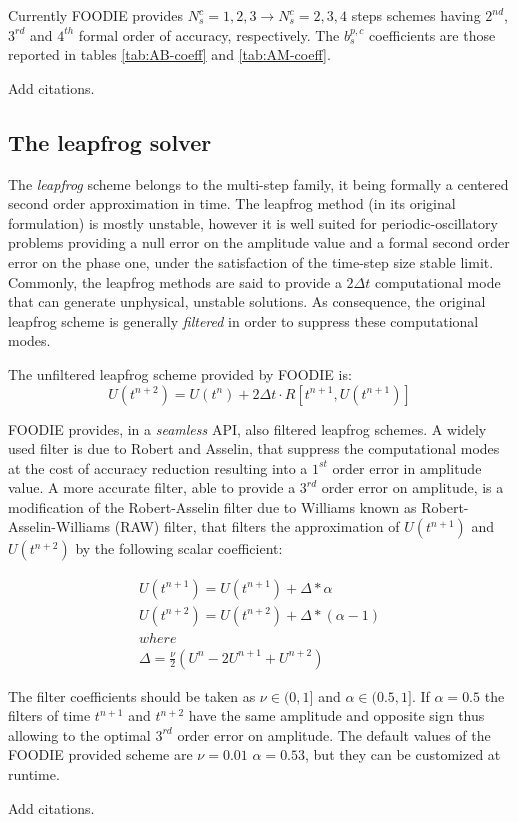Currently FOODIE provides $N_s^c=1, 2, 3 \rightarrow N_s^c=2, 3, 4$ steps schemes having $2^{nd}$, $3^{rd}$ and $4^{th}$ formal order of accuracy, respectively. The $b_s^{p,c}$ coefficients are those reported in tables \ref{tab:AB-coeff} and \ref{tab:AM-coeff}.

{\color{red} Add citations.}

\subsection{The leapfrog solver}

The \emph{leapfrog} scheme belongs to the multi-step family, it being formally a centered second order approximation in time. The leapfrog method (in its original formulation) is mostly unstable, however it is well suited for periodic-oscillatory problems providing a null error on the amplitude value and a formal second order error on the phase one, under the satisfaction of the time-step size stable limit. Commonly, the leapfrog methods are said to provide a $2 \Delta t$ computational mode that can generate unphysical, unstable solutions. As consequence, the original leapfrog scheme is generally \emph{filtered} in order to suppress these computational modes.

The unfiltered leapfrog scheme provided by FOODIE is:
\begin{equation}
  U\left(t^{n+2}\right) = U\left(t^{n}\right) + 2\Delta t \cdot R\left[t^{n+1}, U\left(t^{n+1}\right)\right]
\label{eq:leapfrog}
\end{equation}

FOODIE provides, in a \emph{seamless} API, also filtered leapfrog schemes. A widely used filter is due to Robert and Asselin, that suppress the computational modes at the cost of accuracy reduction resulting into a $1^{st}$ order error in amplitude value. A more accurate filter, able to provide a $3^{rd}$ order error on amplitude, is a modification of the Robert-Asselin filter due to Williams known as Robert-Asselin-Williams (RAW) filter, that filters the approximation of $U\left(t^{n+1}\right)$ and $U\left(t^{n+2}\right)$ by the following scalar coefficient:

\begin{equation}
  \begin{matrix}
    U\left(t^{n+1}\right) = U\left(t^{n+1}\right) + \Delta * \alpha     \\
    U\left(t^{n+2}\right) = U\left(t^{n+2}\right) + \Delta * (\alpha-1) \\
    where \\
    \Delta = \frac{\nu}{2}(U^{n} - 2 U^{n+1} + U^{n+2})
  \end{matrix}
\label{eq:leapfrog-RAW}
\end{equation}

The filter coefficients should be taken as $\nu \in (0,1]$ and $\alpha \in (0.5,1]$. If $\alpha=0.5$ the filters of time $t^{n+1}$ and $t^{n+2}$ have the same amplitude and opposite sign thus allowing to the optimal $3^{rd}$ order error on amplitude. The default values of the FOODIE provided scheme are $\nu=0.01$ $\alpha=0.53$, but they can be customized at runtime.

{\color{red} Add citations.}

